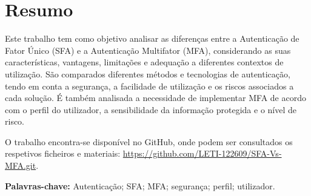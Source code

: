 \section*{Resumo}

\hspace{1cm} Este trabalho tem como objetivo analisar as diferenças entre a Autenticação de Fator Único (SFA) e a Autenticação Multifator (MFA), considerando as suas características, vantagens, limitações e adequação a diferentes contextos de utilização. São comparados diferentes métodos e tecnologias de autenticação, tendo em conta a segurança, a facilidade de utilização e os riscos associados a cada solução. É também analisada a necessidade de implementar MFA de acordo com o perfil do utilizador, a sensibilidade da informação protegida e o nível de risco.

\hspace{1cm} O trabalho encontra-se disponível no GitHub, onde podem ser consultados os respetivos ficheiros e materiais: \url{https://github.com/LETI-122609/SFA-Vs-MFA.git}.

\vspace{0.5cm}

\noindent\textbf{Palavras-chave:} Autenticação; SFA; MFA; segurança; perfil; utilizador.